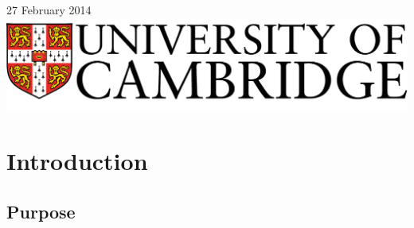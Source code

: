 \documentclass[12p, a4paper, onecolumn]{report}
\begin{document}
\begin{titlepage}

{\large 27 February 2014}\\[3cm] %


\includegraphics{logo.png}\\[1cm] %
 

\vfill %

\end{titlepage}

\setcounter{page}{1}

\tableofcontents

\newpage

\setcounter{page}{1}

\chapter{Introduction}

\section{Purpose}
\end{document}
